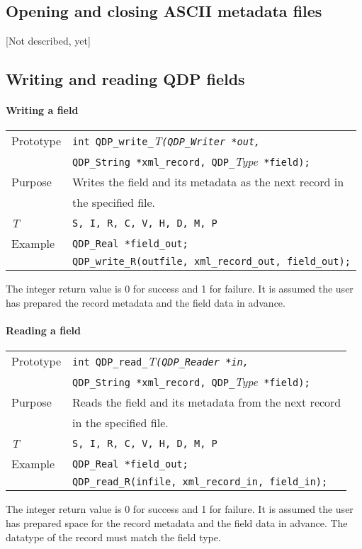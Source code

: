 \documentclass{article}
\newcommand{\allTypes}{{\tt S, I, R, C, V, H, D, M, P}}
\newcommand{\itt}{\it T}
\newcommand{\QMDhandle}{{\tt QDP\_String }}
\begin{document}
\subsection{Opening and closing ASCII metadata files}
[Not described, yet]

\subsection{Writing and reading QDP fields}

\paragraph{Writing a field}

\begin{flushleft}
  \begin{tabular}{|l|l|}
  \hline
  Prototype      & \verb|int QDP_write_|\itt\verb|(QDP_Writer *out,|\\
                 &  \QMDhandle \verb|*xml_record, QDP_|{\it Type}\verb| *field);|\\
    \hline
  Purpose        & Writes the field and its metadata as the next record in \\
                 & the specified file. \\
\hline
  \itt     & \allTypes \\
   \hline
  Example  & \verb|QDP_Real *field_out;| \\
           & \verb|QDP_write_R(outfile, xml_record_out, field_out);| \\
   \hline
 \end{tabular}
\end{flushleft}
%
The integer return value is 0 for success and 1 for failure.  It is
assumed the user has prepared the record metadata and the field data
in advance.

\paragraph{Reading a field}

\begin{flushleft}
  \begin{tabular}{|l|l|}
  \hline
  Prototype      & \verb|int QDP_read_|\itt\verb|(QDP_Reader *in,|\\
                 &  \QMDhandle \verb|*xml_record, QDP_|{\it Type}\verb| *field);|\\
    \hline
  Purpose        & Reads the field and its metadata from the next record \\
                 & in the specified file. \\
\hline
  \itt     & \allTypes \\
   \hline
  Example  & \verb|QDP_Real *field_out;| \\
           & \verb|QDP_read_R(infile, xml_record_in, field_in);| \\
   \hline
 \end{tabular}
\end{flushleft}
%
The integer return value is 0 for success and 1 for failure.  It is
assumed the user has prepared space for the record metadata and the
field data in advance.  The datatype of the record must match the
field type.
\end{document}
